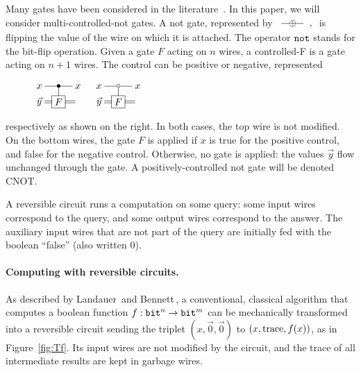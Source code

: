 \documentclass{article}
\theoremstyle{plain}
\theoremstyle{definition}
\newcommand{\bit}{{\tt bit}}
\begin{document}
Many gates have been considered in the
literature~\cite{rev-survey-2011}. In this paper, we will consider
multi-controlled-not gates. A not gate, represented by
$
\xymatrix@R=.05in@C=.1in{
  \ar@{-}[r] & *{\oplus} \ar@{-}[r] &~,
}
$
is flipping the value of the wire on which it is attached. The
operator ${\tt not}$ stands for the bit-flip operation. Given a
gate $F$ acting on $n$ wires, a controlled-F is a gate acting on $n+1$
wires. The control can be positive or negative, represented
\begin{wrapfigure}{r}{0.35\textwidth}
\vspace{-10pt}
\begin{minipage}{0.33\textwidth}
  $\xymatrix@R=.05in@C=.1in{
  x\ar@{-}[r] & *{\bullet} \ar@{-}[r]\ar@{-}[d] & x
  \\
  \vec{y}\ar@{=}[r] & *+[F]{F} \ar@{=}[r] & 
}
\quad
\xymatrix@R=.05in@C=.1in{
  x \ar@{-}[r] & *{\circ} \ar@{-}[r]\ar@{-}[d] & x
  \\
  \vec{y} \ar@{=}[r] & *+[F]{F} \ar@{=}[r] &
}$
\end{minipage}
\vspace{-10pt}
\end{wrapfigure}
respectively as shown on the right.
In both cases, the top wire is not modified. On the bottom wires, the
gate $F$ is applied if $x$ is true for the positive control, and
false for the negative control. Otherwise, no gate is applied: the
values $\vec{y}$ flow unchanged through the gate.
A positively-controlled not gate will be denoted CNOT.


A reversible circuit runs a computation on some query: some input
wires correspond to the query, and some output wires correspond to the
answer. The auxiliary input wires that are not part of the query are
initially fed with the boolean ``false'' (also written $0$).


\paragraph{\bf Computing with reversible circuits.}
As described by Landauer\,\cite{landauer61irreversibility} and
Bennett\,\cite{bennett73logical}, a conventional, classical algorithm
that computes a boolean function $f:\bit^n \to \bit^m$ can be mechanically
transformed into a reversible circuit sending the triplet
$(x,\vec{0},\vec{0})$ to $(x,{\rm trace},f(x))$, as in
Figure~\ref{fig:Tf}. Its input wires are not modified by the circuit,
and the trace of all intermediate results are kept in garbage wires.
\end{document}
